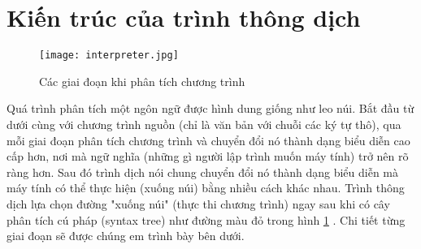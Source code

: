 \section{Kiến trúc của trình thông dịch}
\begin{figure}[h]
    \texttt{[image: interpreter.jpg]}   
    \centering
    \caption{Các giai đoạn khi phân tích chương trình} 
    \label{fig:stages}
\end{figure}

Quá trình phân tích một ngôn ngữ được hình dung giống như leo núi. Bắt đầu từ dưới cùng với chương trình nguồn (chỉ là văn bản với chuỗi các ký tự thô), qua mỗi giai đoạn phân tích chương trình và chuyển đổi nó thành dạng biểu diễn cao cấp hơn, nơi mà ngữ nghĩa (những gì người lập trình muốn máy tính) trở nên rõ ràng hơn. Sau đó trình dịch nói chung chuyển đổi nó thành dạng biểu diễn mà máy tính có thể thực hiện (xuống núi) bằng nhiều cách khác nhau. Trình thông dịch lựa chọn đường "xuống núi" (thực thi chương trình) ngay sau khi có cây phân tích cú pháp (syntax tree) như đường màu đỏ trong hình \ref{fig:stages} \cite{craftinginterpreters}. Chi tiết từng giai đoạn sẽ được chúng em trình bày bên dưới.







